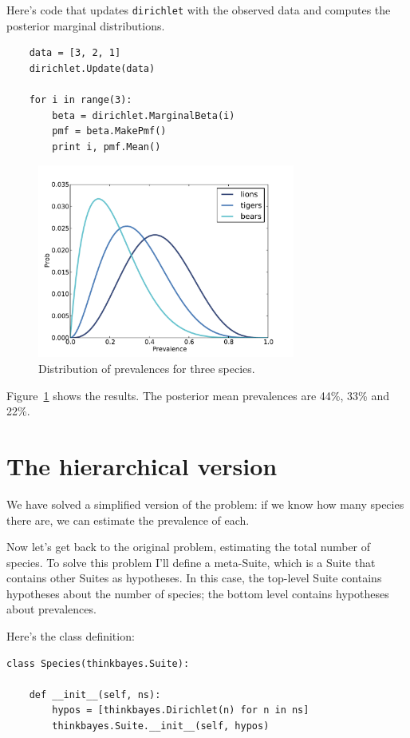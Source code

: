 \documentclass[12pt]{book}
\begin{document}
Here's code that updates {\tt dirichlet} with the observed data and
computes the posterior marginal distributions.

\begin{verbatim}
    data = [3, 2, 1]
    dirichlet.Update(data)

    for i in range(3):
        beta = dirichlet.MarginalBeta(i)
        pmf = beta.MakePmf()
        print i, pmf.Mean()
\end{verbatim}

\begin{figure}
\centerline{\includegraphics[height=2.5in]{figs/species1.pdf}}
\caption{Distribution of prevalences for three species.}
\label{fig.species1}
\end{figure}

Figure~\ref{fig.species1} shows the results.  The posterior
mean prevalences are 44\%, 33\% and 22\%.


\section{The hierarchical version}

We have solved a simplified version of the problem: if we
know how many species there are, we can estimate the prevalence
of each.

Now let's get back to the original problem, estimating the total
number of species.  To solve this problem I'll define a meta-Suite,
which is a Suite that contains other Suites as hypotheses.  In this
case, the top-level Suite contains hypotheses about the number of
species; the bottom level contains hypotheses about prevalences.

Here's the class definition:

\begin{verbatim}
class Species(thinkbayes.Suite):

    def __init__(self, ns):
        hypos = [thinkbayes.Dirichlet(n) for n in ns]
        thinkbayes.Suite.__init__(self, hypos)
\end{verbatim}
\end{document}
